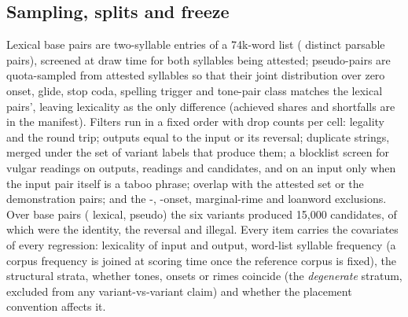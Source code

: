 \subsection{Sampling, splits and freeze}
\label{sec:sampling}
Lexical base pairs are two-syllable entries of a 74k-word list (\releaseNLexicalPairsAvailable{} distinct parsable pairs), screened at draw time for both syllables being attested; pseudo-pairs are quota-sampled from attested syllables so that their joint distribution over zero onset, glide, stop coda, spelling trigger and tone-pair class matches the lexical pairs', leaving lexicality as the only difference (achieved shares and shortfalls are in the manifest). Filters run in a fixed order with drop counts per cell: legality and the round trip; outputs equal to the input or its reversal; duplicate strings, merged under the set of variant labels that produce them; a blocklist screen for vulgar readings on outputs, readings and candidates, and on an input only when the input pair itself is a taboo phrase; overlap with the attested set or the demonstration pairs; and the -, -onset, marginal-rime and loanword exclusions. Over \releaseNBasePairs{} base pairs (\releaseNLexicalBasePairs{} lexical, \releaseNPseudoBasePairs{} pseudo) the six variants produced 15,000 candidates, of which \releaseDropIdentity{} were the identity, \releaseDropReversal{} the reversal and \releaseDropIllegal{} illegal. Every item carries the covariates of every regression: lexicality of input and output, word-list syllable frequency (a corpus frequency is joined at scoring time once the reference corpus is fixed), the structural strata, whether tones, onsets or rimes coincide (the \emph{degenerate} stratum, excluded from any variant-vs-variant claim) and whether the placement convention affects it.

